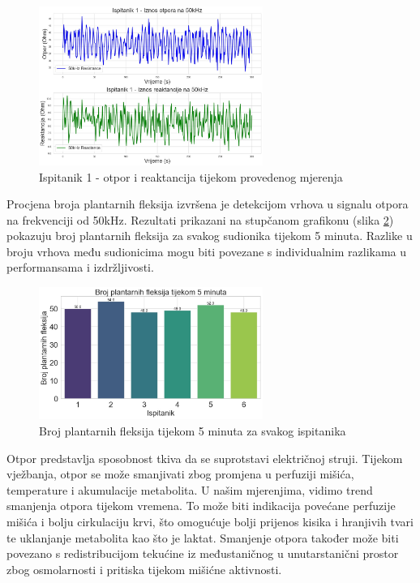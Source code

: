 \documentclass[../diplomski_rad.tex]{subfiles}
\begin{document}
\begin{figure}[htb]
    \centering
    \includegraphics[width=0.65\textwidth]{Figures/otpor_i_reaktancija.jpeg} 
    \caption{Ispitanik 1 - otpor i reaktancija tijekom provedenog mjerenja}
    \label{slk:otpor_i_reaktancija}
\end{figure}

Procjena broja plantarnih fleksija izvršena je detekcijom vrhova u signalu otpora na frekvenciji od 50kHz. 
Rezultati prikazani na stupčanom grafikonu (slika \ref{slk:broj_fleksija}) pokazuju broj plantarnih 
fleksija za svakog sudionika tijekom 5 minuta. 
Razlike u broju vrhova među sudionicima mogu biti povezane s individualnim razlikama u performansama i izdržljivosti.

\begin{figure}[htb]
    \centering
    \includegraphics[width=0.65\textwidth]{Figures/broj_fleksija.jpeg} 
    \caption{Broj plantarnih fleksija tijekom 5 minuta za svakog ispitanika}
    \label{slk:broj_fleksija}
\end{figure}

Otpor predstavlja sposobnost tkiva da se suprotstavi električnoj struji. 
Tijekom vježbanja, otpor se može smanjivati zbog promjena u perfuziji mišića, 
temperature i akumulacije metabolita. U našim mjerenjima, vidimo trend smanjenja otpora tijekom vremena. 
To može biti indikacija povećane perfuzije mišića i bolju cirkulaciju krvi, 
što omogućuje bolji prijenos kisika i hranjivih tvari te uklanjanje metabolita kao što je laktat. 
Smanjenje otpora također može biti povezano s redistribucijom tekućine iz 
međustaničnog u unutarstanični prostor zbog osmolarnosti i pritiska tijekom mišićne aktivnosti.
\end{document}

